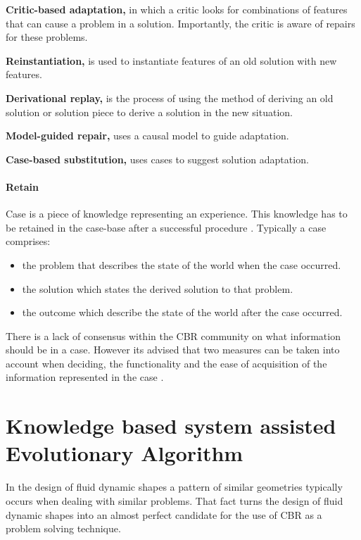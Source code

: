 \textbf{Critic-based adaptation,}
in which a critic looks for combinations of features that can cause a problem in 
a solution. Importantly, the critic is aware of repairs for these problems.

\textbf{Reinstantiation,}
is used to instantiate features of an old solution with new features.

\textbf{Derivational replay,}
is the process of using the method of deriving an old solution or solution piece to derive a solution in the new situation.

\textbf{Model-guided repair,}
uses a causal model to guide adaptation.

\textbf{Case-based substitution,}
uses cases to suggest solution adaptation.
\paragraph{Retain}
\label{Retain} Case is a piece of knowledge representing an experience. This knowledge has to 
be retained in the case-base after a successful procedure \cite{kolodner_1993}. Typically a case comprises:   
\begin{itemize}
	\item the problem that describes the state of the world when the case occurred.
	\item the solution which states the derived solution to that problem.
	\item the outcome which describe the state of the world after the case occurred. 
\end{itemize}

There is a lack of consensus within the CBR community on what information should be in a case. However its advised that two measures can be taken into account when deciding,
 the functionality and the ease of acquisition of the information represented in the case \cite{kolodner_1993}. 


\section{Knowledge based system assisted Evolutionary Algorithm}
In the design of fluid dynamic shapes a pattern of similar geometries typically occurs when dealing with similar problems.  
That fact turns the design of fluid dynamic shapes into an almost perfect candidate for the
use of CBR as a problem solving technique. 

